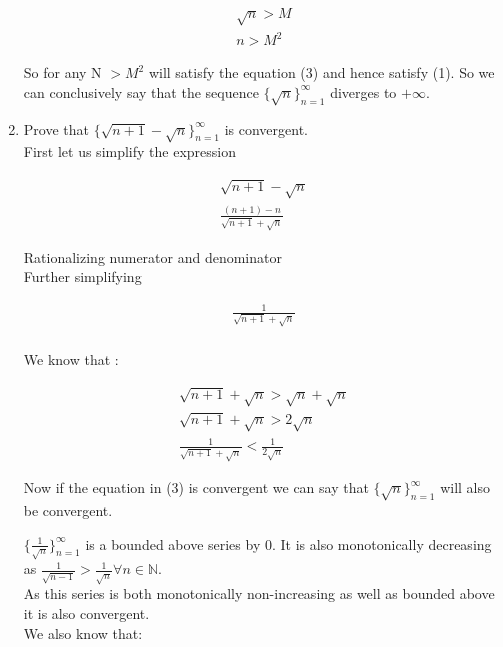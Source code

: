 \documentclass[11pt, letterpaper]{article}
\begin{document}
\begin{enumerate}
{	\begin{eqnarray}
		\sqrt{n} > M\\
		n > M^2
	\end{eqnarray}
	
	So for any N $> M^2$ will satisfy the equation (3) and hence satisfy (1). So we can conclusively say that the sequence $ \lbrace \sqrt{n} \rbrace_{n=1}^\infty $ diverges to $+\infty$.
}

\item{Prove that $\lbrace \sqrt{n+1} - \sqrt{n} \rbrace_{n=1}^\infty$ is convergent.\\
	First let us simplify the expression
	
	\setcounter{equation}{0}
	
	\begin{eqnarray}
		\sqrt{n+1} - \sqrt{n} \nonumber\\
		\frac{(n+1) - n}{\sqrt{n+1} + \sqrt{n}} 
	\end{eqnarray}
	
	\begin{center}
		Rationalizing numerator and denominator\\
		Further simplifying
	\end{center}
	
	\begin{eqnarray}
		\frac{1}{\sqrt{n+1} + \sqrt{n}} \nonumber \\
	\end{eqnarray}
	
	We know that :
	
	\begin{eqnarray}
		\sqrt{n+1} + \sqrt{n} > \sqrt{n} + \sqrt{n} \nonumber \\
		\sqrt{n+1} + \sqrt{n} > 2\sqrt{n} \nonumber \\
		\frac{1}{\sqrt{n+1} + \sqrt{n}} < \frac{1}{2\sqrt{n}}
	\end{eqnarray}
	
	Now if the equation in (3) is convergent we can say that $ \lbrace \sqrt{n} \rbrace_{n=1}^\infty $ will also be convergent.
	
	$ \lbrace \frac{1}{\sqrt{n}} \rbrace_{n=1}^\infty $ is a bounded above series by 0. It is also monotonically decreasing as $\frac{1}{\sqrt{n-1}} > \frac{1}{\sqrt{n}} \forall n \in \mathbb{N}$.\\
	As this series is both monotonically non-increasing as well as bounded above it is also convergent.\\
	We also know that:
	
}
\end{enumerate}
\end{document}
